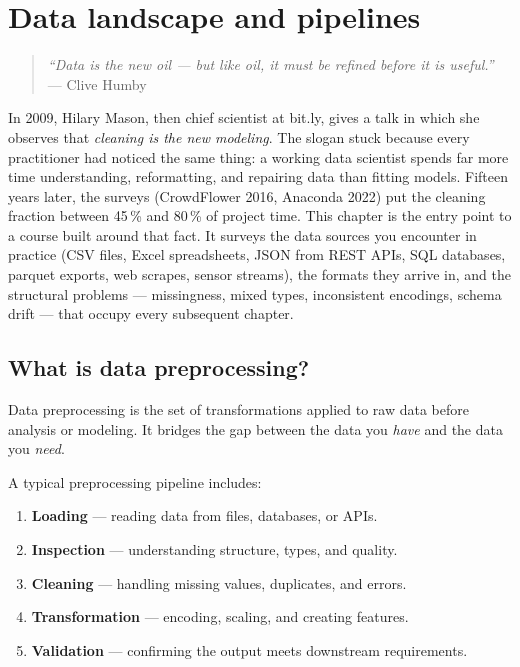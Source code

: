\chapter{Data landscape and pipelines}
\label{ch:data-landscape}

\begin{quote}
\emph{``Data is the new oil --- but like oil, it must be refined before it is useful.''}
--- Clive Humby
\end{quote}

In 2009, Hilary Mason, then chief scientist at bit.ly, gives a talk in which she observes that \emph{cleaning is the new modeling}. The slogan stuck because every practitioner had noticed the same thing: a working data scientist spends far more time understanding, reformatting, and repairing data than fitting models. Fifteen years later, the surveys (CrowdFlower 2016, Anaconda 2022) put the cleaning fraction between 45\,\% and 80\,\% of project time. This chapter is the entry point to a course built around that fact. It surveys the data sources you encounter in practice (CSV files, Excel spreadsheets, JSON from REST APIs, SQL databases, parquet exports, web scrapes, sensor streams), the formats they arrive in, and the structural problems --- missingness, mixed types, inconsistent encodings, schema drift --- that occupy every subsequent chapter.

\section{What is data preprocessing?}

Data preprocessing is the set of transformations applied to raw data before analysis or modeling. It bridges the gap between the data you \emph{have} and the data you \emph{need}.

A typical preprocessing pipeline includes:
\begin{enumerate}
  \item \textbf{Loading} --- reading data from files, databases, or APIs.
  \item \textbf{Inspection} --- understanding structure, types, and quality.
  \item \textbf{Cleaning} --- handling missing values, duplicates, and errors.
  \item \textbf{Transformation} --- encoding, scaling, and creating features.
  \item \textbf{Validation} --- confirming the output meets downstream requirements.
\end{enumerate}

